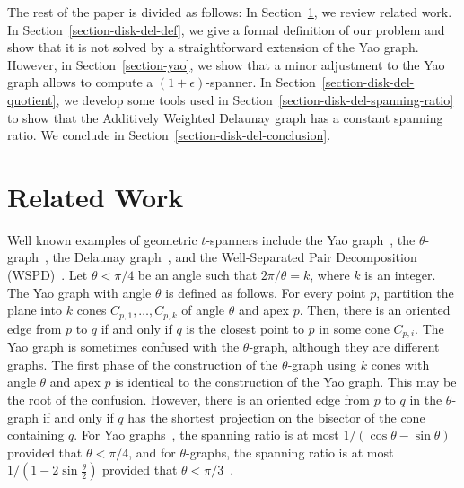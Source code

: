 \documentclass[pdftex,leqno,fleqn,12pt]{article}
\begin{document}
The rest of the paper is divided as follows: In Section~\ref{section-disk-del-related}, we review
related work. In Section~\ref{section-disk-del-def}, we give a formal definition of our problem and
show that it is not solved by a straightforward extension of the Yao graph. However, in
Section~\ref{section-yao}, we show that a minor adjustment to the Yao graph allows to compute a
$(1+\epsilon)$-spanner. In Section~\ref{section-disk-del-quotient}, we develop some tools used in
Section~\ref{section-disk-del-spanning-ratio} to show that the Additively Weighted Delaunay graph
has a constant spanning ratio. We conclude in Section~\ref{section-disk-del-conclusion}.

\section{Related Work}\label{section-disk-del-related}

Well known examples of geometric $t$-spanners include the Yao
graph~\cite{yao82}, the $\theta$-graph~\cite{ruppert91}, the Delaunay
graph~\cite{keil92}, and the Well-Separated Pair Decomposition
(WSPD)~\cite{callahan95}. Let $\theta<\pi/4$ be an angle such that
$2\pi/\theta=k$, where $k$ is an integer. The Yao graph with angle $\theta$
is defined as follows. For every point $p$, partition the plane into $k$
cones $C_{p,1},\ldots,C_{p,k}$ of angle $\theta$ and apex $p$.  Then, there
is an oriented edge from $p$ to $q$ if and only if $q$ is the closest point
to $p$ in some cone $C_{p,i}$. The Yao graph is sometimes confused with the
$\theta$-graph, although they are different graphs. The first phase of the
construction of the $\theta$-graph using $k$ cones with angle $\theta$ and
apex $p$ is identical to the construction of the Yao graph. This may be the
root of the confusion. However, there is an oriented edge from $p$ to $q$ in
the $\theta$-graph if and only if $q$ has the shortest projection on the
bisector of the cone containing $q$. For Yao graphs~\cite{yao82}, the
spanning ratio is at most $1/(\cos\theta-\sin\theta)$ provided that
$\theta<\pi/4$, and for $\theta$-graphs, the spanning ratio is at
most~$1/(1-2\sin\frac{\theta}{2})$ provided that
$\theta<\pi/3$~\cite{ruppert91}.
\end{document}
